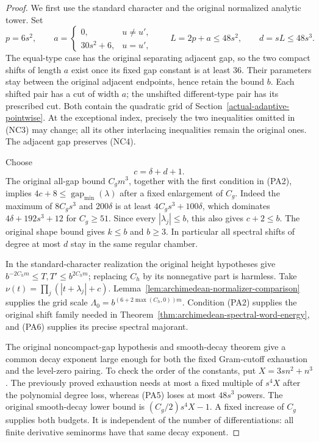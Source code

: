 \begin{proof}
We first use the standard character and the original normalized
analytic tower. Set
\[
 p=6s^2,\qquad
 a=\begin{cases}0,&u\ne u',\\30s^2+6,&u=u',\end{cases}
 \qquad L=2p+a\le48s^2,
 \qquad d=sL\le48s^3 .                                \tag{PA5}
\]
The equal-type case has the original separating adjacent gap,
so the two compact shifts of length \(a\) exist once its fixed
gap constant is at least \(36\). Their parameters stay between
the original adjacent endpoints, hence retain the bound \(b\).
Each shifted pair has a cut of width \(a\); the unshifted
different-type pair has its prescribed cut. Both contain the
quadratic grid of Section~\ref{actual-adaptive-pointwise}.
At the exceptional index, precisely the two inequalities omitted
in (NC3) may change; all its other interlacing inequalities remain
the original ones. The adjacent gap preserves (NC4).

Choose
\[
                         c=\delta+d+1 .                \tag{PA6}
\]
The original all-gap bound \(C_gm^3\), together with the first
condition in (PA2), implies \(4c+8\le\operatorname{gap}_{\min}
(\lambda)\) after a fixed enlargement of \(C_g\).
Indeed the maximum of \(8C_gs^3\) and \(200\delta\) is at
least \(4C_gs^3+100\delta\), which dominates
\(4\delta+192s^3+12\) for \(C_g\ge51\).
Since every \(|\lambda_j|\le b\), this also gives
\(c+2\le b\). The original shape bound gives \(k\le b\)
and \(b\ge3\). In particular all spectral shifts of degree
at most \(d\) stay in the same regular chamber.

In the standard-character realization the original height
hypotheses give
\(b^{-2C_hm}\le T,T'\le b^{2C_hm}\); replacing \(C_h\)
by its nonnegative part is harmless. Take
\(\nu(t)=\prod_j(|t+\lambda_j|+c)\).
Lemma~\ref{lem:archimedean-normalizer-comparison} supplies
the grid scale \(\Lambda_0=b^{(6+2\max(C_h,0))m}\).
Condition (PA2) supplies the original shift family needed in
Theorem~\ref{thm:archimedean-spectral-word-energy}, and
(PA6) supplies its precise spectral majorant.

The original noncompact-gap hypothesis and smooth-decay theorem
give a common decay exponent large enough for both the fixed
Gram-cutoff exhaustion and the level-zero pairing. To check the
order of the constants, put \(X=3sn^2+n^3\). The previously
proved exhaustion needs at most a fixed multiple of \(s^4X\)
after the polynomial degree loss, whereas (PA5) loses at most
\(48s^3\) powers. The original smooth-decay lower bound is
\((C_g/2)s^4X-1\). A fixed increase of \(C_g\) supplies both
budgets. It is independent of the number of differentiations:
all finite derivative seminorms have that same decay exponent.


\end{proof}
